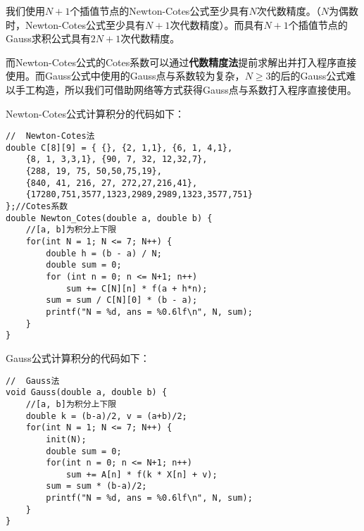 \documentclass[UTF8]{ctexart}
\begin{document}
	我们使用$N+1$个插值节点的Newton-Cotes公式至少具有$N$次代数精度。（$N$为偶数时，Newton-Cotes公式至少具有$N+1$次代数精度）。而具有$N+1$个插值节点的Gauss求积公式具有$2N+1$次代数精度。
	
	而Newton-Cotes公式的Cotes系数可以通过\textbf{代数精度法}提前求解出并打入程序直接使用。而Gauss公式中使用的Gauss点与系数较为复杂，$N \geq 3$的后的Gauss公式难以手工构造，所以我们可借助网络等方式获得Gauss点与系数打入程序直接使用。
	
	Newton-Cotes公式计算积分的代码如下：
	\lstset{language=C++}%
	
	\begin{lstlisting}
//	Newton-Cotes法
double C[8][9] = { {}, {2, 1,1}, {6, 1, 4,1}, 
	{8, 1, 3,3,1}, {90, 7, 32, 12,32,7}, 
	{288, 19, 75, 50,50,75,19}, 
	{840, 41, 216, 27, 272,27,216,41},
	{17280,751,3577,1323,2989,2989,1323,3577,751} 
};//Cotes系数
double Newton_Cotes(double a, double b) {
	//[a, b]为积分上下限
	for(int N = 1; N <= 7; N++) {
		double h = (b - a) / N;
		double sum = 0;
		for (int n = 0; n <= N+1; n++) 
			sum += C[N][n] * f(a + h*n);
		sum = sum / C[N][0] * (b - a);
		printf("N = %d, ans = %0.6lf\n", N, sum);
	}
}		
	\end{lstlisting}

	Gauss公式计算积分的代码如下：
\lstset{language=C++}%

\begin{lstlisting}
//	Gauss法
void Gauss(double a, double b) {
	//[a, b]为积分上下限
	double k = (b-a)/2, v = (a+b)/2;
	for(int N = 1; N <= 7; N++) {
		init(N);
		double sum = 0;
		for(int n = 0; n <= N+1; n++)
			sum += A[n] * f(k * X[n] + v);
		sum = sum * (b-a)/2;
		printf("N = %d, ans = %0.6lf\n", N, sum);
	}
}
\end{lstlisting}
	
\end{document}
